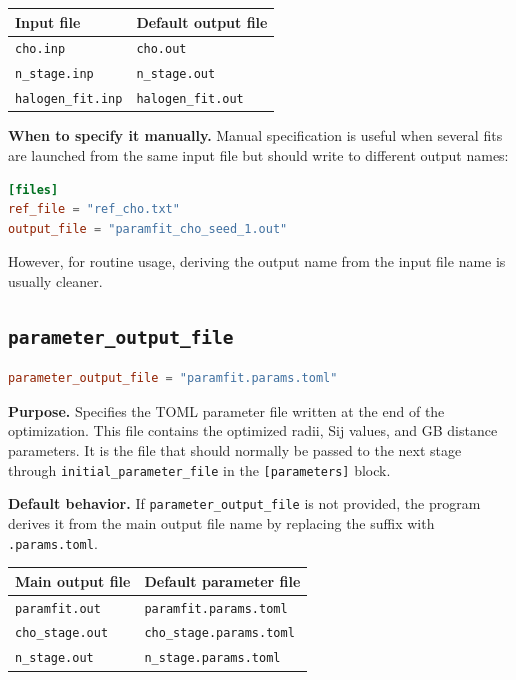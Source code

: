 \documentclass[11pt]{article}
\begin{document}
\begin{center}
\begin{tabular}{ll}
\toprule
Input file & Default output file \\
\midrule
\texttt{cho.inp} & \texttt{cho.out} \\
\texttt{n\_stage.inp} & \texttt{n\_stage.out} \\
\texttt{halogen\_fit.inp} & \texttt{halogen\_fit.out} \\
\bottomrule
\end{tabular}
\end{center}

\textbf{When to specify it manually.}
Manual specification is useful when several fits are launched from the same
input file but should write to different output names:

\begin{lstlisting}[language=toml]
[files]
ref_file = "ref_cho.txt"
output_file = "paramfit_cho_seed_1.out"
\end{lstlisting}

However, for routine usage, deriving the output name from the input file name is
usually cleaner.

\subsection{\texttt{parameter\_output\_file}}

\begin{lstlisting}[language=toml]
parameter_output_file = "paramfit.params.toml"
\end{lstlisting}

\textbf{Purpose.}
Specifies the TOML parameter file written at the end of the optimization. This
file contains the optimized radii, Sij values, and GB distance parameters. It is
the file that should normally be passed to the next stage through
\texttt{initial\_parameter\_file} in the \texttt{[parameters]} block.

\textbf{Default behavior.}
If \texttt{parameter\_output\_file} is not provided, the program derives it from
the main output file name by replacing the suffix with
\texttt{.params.toml}.

\begin{center}
\begin{tabular}{ll}
\toprule
Main output file & Default parameter file \\
\midrule
\texttt{paramfit.out} & \texttt{paramfit.params.toml} \\
\texttt{cho\_stage.out} & \texttt{cho\_stage.params.toml} \\
\texttt{n\_stage.out} & \texttt{n\_stage.params.toml} \\
\bottomrule
\end{tabular}
\end{center}
\end{document}

